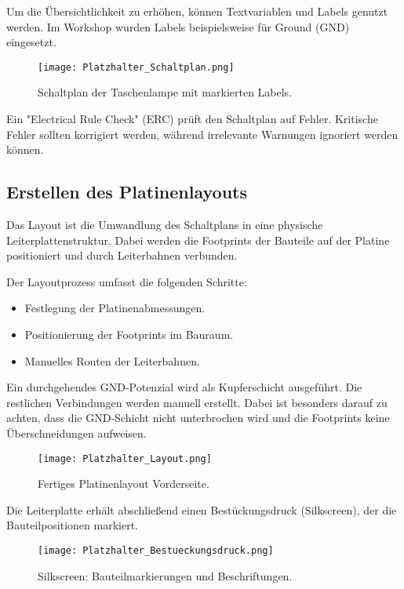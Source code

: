 Um die Übersichtlichkeit zu erhöhen, können Textvariablen und Labels genutzt werden. Im Workshop wurden Labels beispielsweise für Ground (GND) eingesetzt.  

\begin{figure}[h]  
    \centering  
    \texttt{[image: Platzhalter\_Schaltplan.png]}  
    \caption{Schaltplan der Taschenlampe mit markierten Labels.}  
    \label{fig:Abbildung 10}
\end{figure}  

Ein "Electrical Rule Check" (ERC) prüft den Schaltplan auf Fehler. Kritische Fehler sollten korrigiert werden, während irrelevante Warnungen ignoriert werden können.  

\subsection{Erstellen des Platinenlayouts}  
Das Layout ist die Umwandlung des Schaltplans in eine physische Leiterplattenstruktur. Dabei werden die Footprints der Bauteile auf der Platine positioniert und durch Leiterbahnen verbunden.  

Der Layoutprozess umfasst die folgenden Schritte:  
\begin{itemize}  
    \item Festlegung der Platinenabmessungen.  
    \item Positionierung der Footprints im Bauraum.  
    \item Manuelles Routen der Leiterbahnen.  
\end{itemize}  

Ein durchgehendes GND-Potenzial wird als Kupferschicht ausgeführt. Die restlichen Verbindungen werden manuell erstellt. Dabei ist besonders darauf zu achten, dass die GND-Schicht nicht unterbrochen wird und die Footprints keine Überschneidungen aufweisen.  

\begin{figure}[h]  
    \centering  
    \texttt{[image: Platzhalter\_Layout.png]}  
    \caption{Fertiges Platinenlayout Vorderseite.} 
    \label{fig:Abbildung 11} 
\end{figure}  

Die Leiterplatte erhält abschließend einen Bestückungsdruck (Silkscreen), der die Bauteilpositionen markiert.  

\begin{figure}[h]  
    \centering  
    \texttt{[image: Platzhalter\_Bestueckungsdruck.png]}  
    \caption{Silkscreen: Bauteilmarkierungen und Beschriftungen.}  				\label{fig:Abbildung 11}
\end{figure}  
 
